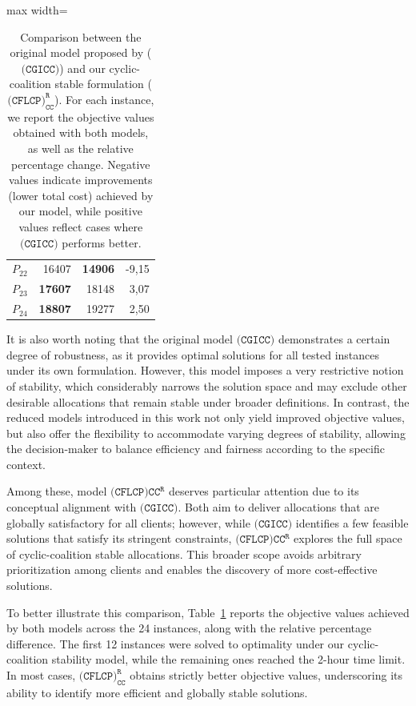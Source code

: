 \documentclass[preprint,11pt,authoryear]{elsarticle}
\begin{document}
\begin{table}
\begin{adjustbox}{max width=\textwidth}
\begin{tabular}{c r r r}
$P_{22}$&16407&\textbf{14906}&-9,15 \\
$P_{23}$&\textbf{17607}&18148&3,07 \\
$P_{24}$&\textbf{18807}&19277&2,50 \\
\bottomrule
\end{tabular}
\end{adjustbox}
\caption{Comparison between the original model proposed by \cite{calvete2020} ($\texttt{(CGICC)}$) and our cyclic-coalition stable formulation ($\texttt{(CFLCP)}_{\texttt{CC}}^\texttt{R}$). For each instance, we report the objective values obtained with both models, as well as the relative percentage change. Negative values indicate improvements (lower total cost) achieved by our model, while positive values reflect cases where $\texttt{(CGICC)}$ performs better.}

\label{tab:cc-vs-calvete}
\end{table}
It is also worth noting that the original model $\texttt{(CGICC)}$ demonstrates a certain degree of robustness, as it provides optimal solutions for all tested instances under its own formulation. However, this model imposes a very restrictive notion of stability, which considerably narrows the solution space and may exclude other desirable allocations that remain stable under broader definitions. In contrast, the reduced models introduced in this work not only yield improved objective values, but also offer the flexibility to accommodate varying degrees of stability, allowing the decision-maker to balance efficiency and fairness according to the specific context.

Among these, model $\texttt{(CFLCP)}{\texttt{CC}}^\texttt{R}$ deserves particular attention due to its conceptual alignment with $\texttt{(CGICC)}$. Both aim to deliver allocations that are globally satisfactory for all clients; however, while $\texttt{(CGICC)}$ identifies a few feasible solutions that satisfy its stringent constraints, $\texttt{(CFLCP)}{\texttt{CC}}^\texttt{R}$ explores the full space of cyclic-coalition stable allocations. This broader scope avoids arbitrary prioritization among clients and enables the discovery of more cost-effective solutions.

To better illustrate this comparison, Table~\ref{tab:cc-vs-calvete} reports the objective values achieved by both models across the 24 instances, along with the relative percentage difference. The first 12 instances were solved to optimality under our cyclic-coalition stability model, while the remaining ones reached the 2-hour time limit. In most cases, $\texttt{(CFLCP)}_{\texttt{CC}}^\texttt{R}$ obtains strictly better objective values, underscoring its ability to identify more efficient and globally stable solutions.
\end{document}
